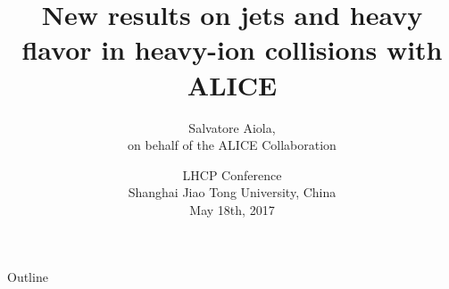 \documentclass[xcolor={usenames,dvipsnames}]{beamer}
\title[Jets and heavy flavor in heavy-ion collisions with ALICE] %
{New results on jets and heavy flavor in heavy-ion collisions with ALICE}
\author[Salvatore Aiola (Yale University)]%
{Salvatore Aiola, \\
on behalf of the ALICE Collaboration}
\institute[Yale University] %
{Yale University}
\date[May 18th, 2017] %
{LHCP Conference \\
Shanghai Jiao Tong University, China\\
May 18th, 2017}
\begin{document}
\begin{frame}
  \titlepage
\end{frame}

\begin{frame}{Outline}
   \tableofcontents
\end{frame}







\end{document}
